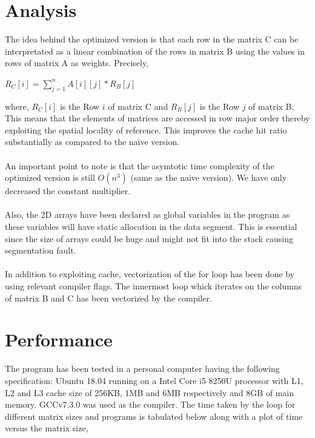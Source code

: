 \documentclass[11pt,a4paper,oneside]{article}
\begin{document}
    \section{Analysis}
    The idea behind the optimized version is that each row in the matrix C can be interpretated as a linear combination of the rows in matrix B using the values in rows of matrix A as weights. Precisely, \\
    \begin{center}
    	$R_C[i] = \sum_{j=1}^{n} A[i][j]*R_B[j]$ \\
    \end{center}
    where, $R_C[i]$ is the Row $i$ of matrix C and $R_B[j]$ is the Row $j$ of matrix B. This means that the elements of matrices are accessed in row major order thereby exploiting the spatial locality of reference. This improves the cache hit ratio substantially as compared to the naive version. \\ \\
    An important point to note is that the asymtotic time complexity of the optimized version is still $O(n^3)$ (same as the naive version). We have only decreased the constant multiplier.\\ \\
    Also, the 2D arrays have been declared as global variables in the program as these variables will have static allocation in the data segment. This is essential since the size of arrays could be huge and might not fit into the stack causing segmentation fault.\\ \\
    In addition to exploiting cache, vectorization of the for loop has been done by using relevant compiler flags. The innermost loop whick iterates on the columns of matrix B and C has been vectorized by the compiler.
    
    \section{Performance}
    The program has been tested in a personal computer having the following specification: Ubuntu 18.04 running on a Intel Core i5 8250U processor with L1, L2 and L3 cache size of 256KB, 1MB and 6MB respectively and 8GB of main memory. GCCv7.3.0 was used as the compiler. The time taken by the loop for different matrix sizes and programs is tabulated below along with a plot of time versus the matrix size, \\
\end{document}
